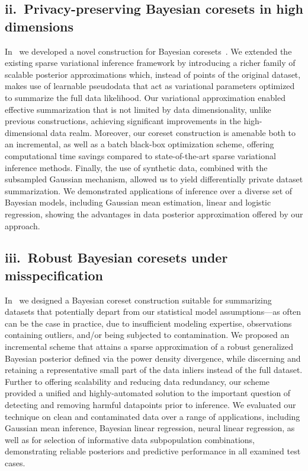 \documentclass[11pt,a4paper,sans]{moderncv} %
\begin{document}
\subsection{ii.~Privacy-preserving Bayesian coresets in high dimensions}
\label{subsec:ch4-summary}
In~\citep{psvi} we developed a novel construction for Bayesian coresets~\citep{huggins16,campbell18,campbell19jmlr,campbell19neurips}. We extended the existing sparse variational inference framework by introducing a richer family of scalable posterior approximations which, instead of points of the original dataset, makes use of learnable pseudodata that act as variational parameters optimized to summarize the full data likelihood. Our variational approximation enabled effective summarization that is not limited by data dimensionality, unlike previous constructions, achieving significant improvements in the high-dimensional data realm. Moreover, our coreset construction is amenable both to an incremental, as well as a batch black-box optimization scheme, offering computational time savings compared to state-of-the-art sparse variational inference methods. Finally, the use of synthetic data, combined with the subsampled Gaussian mechanism, allowed us to yield differentially private dataset summarization. We demonstrated applications of inference over a diverse set of Bayesian models, including Gaussian mean estimation, linear and logistic regression, showing the advantages in data posterior approximation offered by our approach.

\subsection{iii.~Robust Bayesian coresets under misspecification}
\label{subsec:ch4-summary}
In~\citep{beta-cores} we designed a Bayesian coreset construction suitable for summarizing datasets that potentially depart from our statistical model assumptions---as often can be the case in practice, due to insufficient modeling expertise, observations containing outliers, and/or being subjected to contamination. We proposed an incremental scheme that attains a sparse approximation of a robust generalized Bayesian posterior defined via the power density divergence, while discerning and retaining a representative small part of the data inliers instead of the full dataset. Further to offering scalability and reducing data redundancy, our scheme provided a unified and highly-automated solution to the important question of detecting and removing harmful datapoints prior to inference. We evaluated our technique on clean and contaminated data over a range of applications, including Gaussian mean inference, Bayesian linear regression, neural linear regression, as well as for selection of informative data subpopulation combinations, demonstrating reliable posteriors and predictive performance in all examined test cases.
\end{document}

